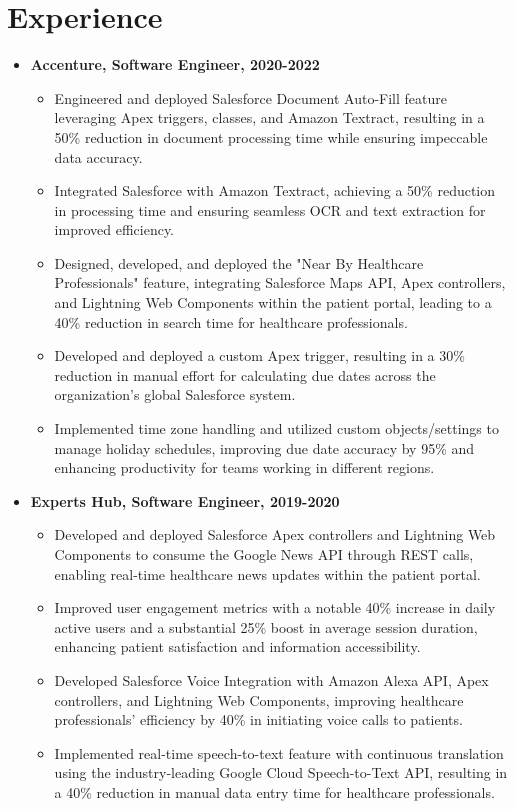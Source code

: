 \documentclass[letterpaper, 9pt]{extarticle}
\begin{document}
\section{Experience}
\begin{itemize}
\item \textbf{Accenture, Software Engineer, 2020-2022}
\begin{itemize}
    \item Engineered and deployed Salesforce Document Auto-Fill feature leveraging Apex triggers, classes, and Amazon Textract, resulting in a 50\% reduction in document processing time while ensuring impeccable data accuracy.

      \item Integrated Salesforce with Amazon Textract, achieving a 50\% reduction in processing time and ensuring seamless OCR and text extraction for improved efficiency.

    \item Designed, developed, and deployed the "Near By Healthcare Professionals" feature, integrating Salesforce Maps API, Apex controllers, and Lightning Web Components within the patient portal, leading to a 40\% reduction in search time for healthcare professionals.
    \item Developed and deployed a custom Apex trigger, resulting in a 30\% reduction in manual effort for calculating due dates across the organization's global Salesforce system.
    \item Implemented time zone handling and utilized custom objects/settings to manage holiday schedules, improving due date accuracy by 95\% and enhancing productivity for teams working in different regions.
\end{itemize}
\item \textbf{Experts Hub, Software Engineer, 2019-2020}
\begin{itemize}
    \item Developed and deployed Salesforce Apex controllers and Lightning Web Components to consume the Google News API through REST calls, enabling real-time healthcare news updates within the patient portal.
    \item Improved user engagement metrics with a notable 40\% increase in daily active users and a substantial 25\% boost in average session duration, enhancing patient satisfaction and information accessibility.
    \item Developed Salesforce Voice Integration with Amazon Alexa API, Apex controllers, and Lightning Web Components, improving healthcare professionals' efficiency by 40\% in initiating voice calls to patients.
   \item Implemented real-time speech-to-text feature with continuous translation using the industry-leading Google Cloud Speech-to-Text API, resulting in a 40\% reduction in manual data entry time for healthcare professionals.
\end{itemize}
\end{itemize}
\end{document}
